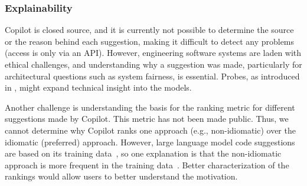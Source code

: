 \subsubsection{Explainability}
\label{explain}
Copilot is closed source, and it is currently not possible to determine the source or the reason behind each suggestion, making it difficult to detect any problems (access is only via an API). 
However, engineering software systems are laden with ethical challenges, and understanding why a suggestion was made, particularly for architectural questions such as system fairness, is essential. 
Probes, as introduced in \cite{karmakar21}, might expand technical insight into the models.

Another challenge is understanding the basis for the ranking metric for different suggestions made by Copilot. 
This metric has not been made public. 
Thus, we cannot determine why Copilot ranks one approach (e.g., non-idiomatic) over the idiomatic (preferred) approach. However, large language model code suggestions are based on its training data~\cite{training_extraction}, so one explanation is that the non-idiomatic approach is more frequent in the training data~\cite{stochastic_parrots}. 
Better characterization of the rankings would allow users to better understand the motivation. 